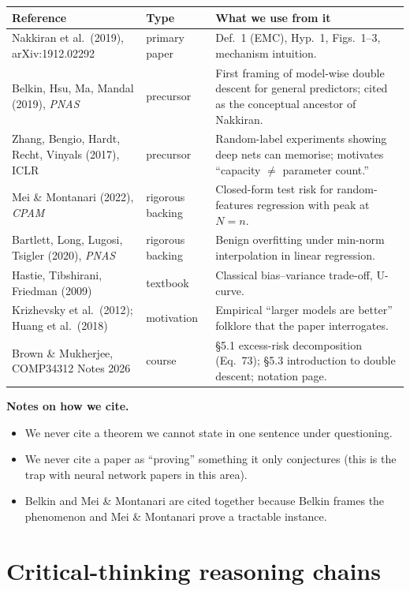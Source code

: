 \documentclass[11pt,a4paper]{article}
\theoremstyle{definition}
\begin{document}
\renewcommand{\arraystretch}{1.18}
\noindent\begin{tabular}{@{}p{4.4cm}p{4cm}p{6.5cm}@{}}
\toprule
Reference & Type & What we use from it \\
\midrule
Nakkiran et al.\ (2019), arXiv:1912.02292 & primary paper & Def.~1 (EMC), Hyp.~1, Figs.~1--3, mechanism intuition. \\
Belkin, Hsu, Ma, Mandal (2019), \emph{PNAS} & precursor & First framing of model-wise double descent for general predictors; cited as the conceptual ancestor of Nakkiran. \\
Zhang, Bengio, Hardt, Recht, Vinyals (2017), ICLR & precursor & Random-label experiments showing deep nets can memorise; motivates ``capacity $\ne$ parameter count.''  \\
Mei \& Montanari (2022), \emph{CPAM} & rigorous backing & Closed-form test risk for random-features regression with peak at $N=n$. \\
Bartlett, Long, Lugosi, Tsigler (2020), \emph{PNAS} & rigorous backing & Benign overfitting under min-norm interpolation in linear regression. \\
Hastie, Tibshirani, Friedman (2009) & textbook & Classical bias--variance trade-off, U-curve. \\
Krizhevsky et al.\ (2012); Huang et al.\ (2018) & motivation & Empirical ``larger models are better'' folklore that the paper interrogates. \\
Brown \& Mukherjee, COMP34312 Notes 2026 & course & \S5.1 excess-risk decomposition (Eq.~73); \S5.3 introduction to double descent; notation page. \\
\bottomrule
\end{tabular}

\medskip

\noindent\textbf{Notes on how we cite.}
\begin{itemize}[leftmargin=1.2em]
\item We never cite a theorem we cannot state in one sentence under questioning.
\item We never cite a paper as ``proving'' something it only conjectures (this is the trap with neural network papers in this area).
\item Belkin and Mei \& Montanari are cited together because Belkin frames the phenomenon and Mei \& Montanari prove a tractable instance.
\end{itemize}

\section{Critical-thinking reasoning chains}
\end{document}
